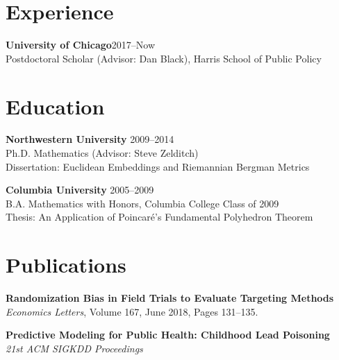 \documentclass[margin,line]{resume}
\begin{document}
\address{epotash@uchicago.edu / \href{http://www.k2co3.net}{k2co3.net} / \href{https://github.com/potash}{github.com/potash}}
\begin{resume}
\section{\mysidestyle Experience}
	{\bf University of Chicago}\hfill{2017--Now}\\
	Postdoctoral Scholar (Advisor: Dan Black), Harris School of Public Policy

    \section{\mysidestyle Education}
	
	{\bf Northwestern University} \hfill {2009--2014} \\%
	Ph.D. Mathematics (Advisor: Steve Zelditch) \\
	Dissertation: Euclidean Embeddings and Riemannian Bergman Metrics

	{\bf Columbia University} \hfill {2005--2009} \\%
    B.A. Mathematics with Honors, Columbia College Class of 2009 \\
	Thesis: An Application of Poincar\'e's Fundamental Polyhedron Theorem

	
	\section{\mysidestyle Publications}
        {\bf Randomization Bias in Field Trials to Evaluate Targeting Methods}\\
        \textit{Economics Letters}, Volume 167, June 2018, Pages 131--135.

	{\bf Predictive Modeling for Public Health: Childhood Lead Poisoning} \\
        \textit{21st ACM SIGKDD Proceedings}


\end{resume}
\end{document}
